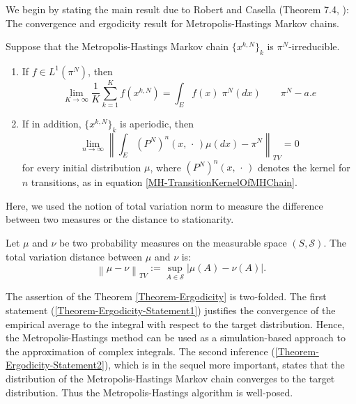 We begin by stating the main result due to Robert and Casella (Theorem 7.4, \autocite{Robert2005}): The convergence and ergodicity result for Metropolis-Hastings Markov chains.

\begin{thm}
\label{Theorem-Ergodicity}
 Suppose that the Metropolis-Hastings Markov chain $ \{ x^{k,N} \}_{k} $ is  $ \pi^{N} $-irreducible.
 \begin{enumerate}
  \item If $ f \in L^1( \pi^{N} ) $, then
  \begin{equation}
  \label{Theorem-Ergodicity-Statement1}
   \lim_{K \to \infty} \frac{1}{K} \sum_{k = 1}^{K} f \left( x^{k,N} \right) = \int_E f(x) \; \pi^{N}(dx) \qquad \pi^{N}-a.e
  \end{equation}
  
  \item If in addition, $ \{ x^{k,N} \}_{k} $ is aperiodic, then
  \begin{equation}
  \label{Theorem-Ergodicity-Statement2}
   \lim_{n \to \infty} \left\| \int_E \left( P^{N} \right)^n (x, \, \cdot \, ) \mu(dx) -  \pi^{N}   \right\|_{TV} = 0
  \end{equation}
  for every initial distribution $\mu$, where $ \left( P^{N} \right)^n (x, \, \cdot \, ) $ denotes the kernel for $n$ transitions, as in equation \ref{MH-TransitionKernelOfMHChain}.

 \end{enumerate}
  
\end{thm}

Here, we used the notion of total variation norm to measure the difference between two measures or the distance to stationarity.

\begin{defin}
 Let $\mu$ and $\nu$ be two probability measures on the measurable space $ \left( S, \mathcal{S} \right) $. The total variation distance between $\mu$ and $\nu$ is:
 \begin{equation}
  \left\| \mu - \nu \right\|_{TV} := \sup_{A \in \mathcal{S}} \left| \mu(A) - \nu(A) \right|.
 \end{equation}

\end{defin}

The assertion of the Theorem \ref{Theorem-Ergodicity} is two-folded. The first statement (\ref{Theorem-Ergodicity-Statement1}) justifies the convergence of the empirical average to the integral with respect to the target distribution. Hence, the Metropolis-Hastings method can be used as a simulation-based approach to the approximation of complex integrals. The second inference (\ref{Theorem-Ergodicity-Statement2}), which is in the sequel more important, states that the distribution of the Metropolis-Hastings Markov chain converges to the target distribution. Thus the Metropolis-Hastings algorithm is well-posed. 

